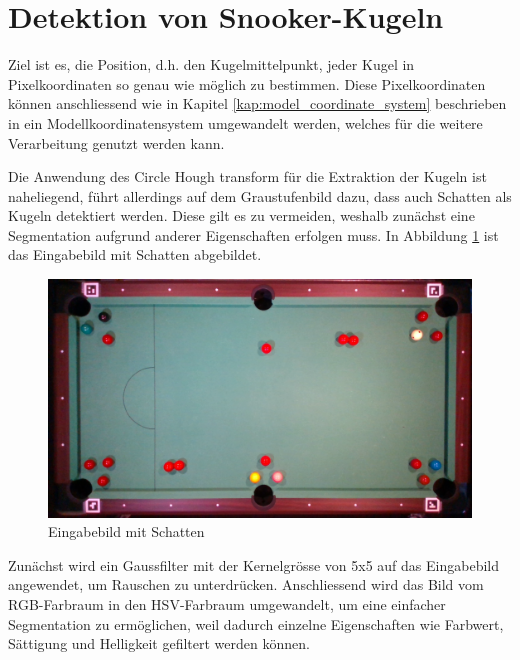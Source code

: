 \section{Detektion von Snooker-Kugeln}\label{kap:snooker_detection}

Ziel ist es, die Position, d.h. den Kugelmittelpunkt, jeder Kugel in Pixelkoordinaten so genau wie möglich zu bestimmen.
Diese Pixelkoordinaten können anschliessend wie in Kapitel \ref{kap:model_coordinate_system} beschrieben in ein
Modellkoordinatensystem umgewandelt werden, welches für die weitere Verarbeitung genutzt werden kann.

Die Anwendung des Circle Hough transform \cite{circle_hough} für die Extraktion der Kugeln ist naheliegend, führt allerdings auf dem
Graustufenbild dazu, dass auch Schatten als Kugeln detektiert werden. Diese gilt es zu vermeiden,
weshalb zunächst eine Segmentation aufgrund anderer Eigenschaften erfolgen muss.
In Abbildung \ref{fig:input_with_shadows} ist das Eingabebild mit Schatten abgebildet.

\begin{figure}[h!]
    \begin{center}
    \includegraphics[width=0.8\linewidth]{../common/resources/detection/input.png}
    \end{center}
    \caption{Eingabebild mit Schatten}
    \label{fig:input_with_shadows}
\end{figure}

Zunächst wird ein Gaussfilter mit der Kernelgrösse von 5x5 auf das Eingabebild angewendet, um Rauschen zu unterdrücken.
Anschliessend wird das Bild vom RGB-Farbraum in den HSV-Farbraum \cite{hsv_color_space} umgewandelt, um eine einfacher
Segmentation zu ermöglichen, weil dadurch einzelne Eigenschaften wie Farbwert, Sättigung und Helligkeit gefiltert werden können.

